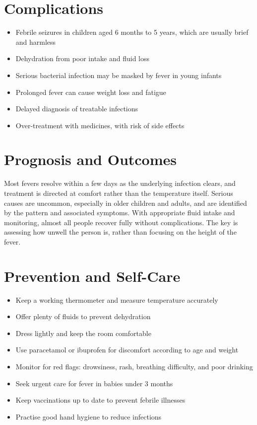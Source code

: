 \section*{Complications}
\begin{itemize}
    \item Febrile seizures in children aged 6 months to 5 years, which are usually brief and harmless
    \item Dehydration from poor intake and fluid loss
    \item Serious bacterial infection may be masked by fever in young infants
    \item Prolonged fever can cause weight loss and fatigue
    \item Delayed diagnosis of treatable infections
    \item Over-treatment with medicines, with risk of side effects
\end{itemize}

\section*{Prognosis and Outcomes}
Most fevers resolve within a few days as the underlying infection clears, and treatment is directed at comfort rather than the temperature itself. Serious causes are uncommon, especially in older children and adults, and are identified by the pattern and associated symptoms. With appropriate fluid intake and monitoring, almost all people recover fully without complications. The key is assessing how unwell the person is, rather than focusing on the height of the fever.

\section*{Prevention and Self-Care}
\begin{itemize}
    \item Keep a working thermometer and measure temperature accurately
    \item Offer plenty of fluids to prevent dehydration
    \item Dress lightly and keep the room comfortable
    \item Use paracetamol or ibuprofen for discomfort according to age and weight
    \item Monitor for red flags: drowsiness, rash, breathing difficulty, and poor drinking
    \item Seek urgent care for fever in babies under 3 months
    \item Keep vaccinations up to date to prevent febrile illnesses
    \item Practise good hand hygiene to reduce infections
\end{itemize}

